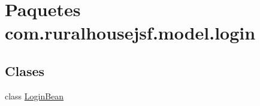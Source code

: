 \hypertarget{a00122}{}\section{Paquetes com.\+ruralhousejsf.\+model.\+login}
\label{a00122}
\subsection*{Clases}
\begin{DoxyCompactItemize}
\item 
class \mbox{\hyperlink{a00232}{Login\+Bean}}
\end{DoxyCompactItemize}
